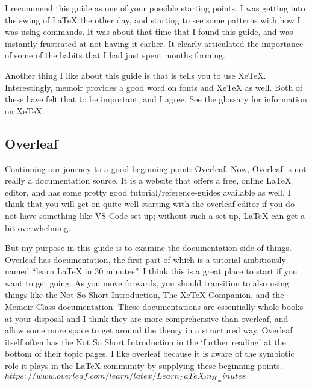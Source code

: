 \documentclass[12pt, oneside]{memoir}
\begin{document}
I recommend this guide as one of your possible starting points. I was getting into the swing of \LaTeX{} the other day, and starting to see some patterns with how I was using commands. It was about that time that I found this guide, and was instantly frustrated at not having it earlier. It clearly articulated the importance of some of the habits that I had just spent months forming.

Another thing I like about this guide is that is tells you to use XeTeX. Interestingly, memoir provides a good word on fonts and XeTeX as well. Both of these have felt that to be important, and I agree. See the glossary for information on XeTeX.

\subsection*{Overleaf}

Continuing our journey to a good beginning-point: Overleaf. Now, Overleaf is not really a documentation source. It is a website that offers a free, online \LaTeX{} editor, and has some pretty good tutorial/reference-guides available as well. I think that you will get on quite well starting with the overleaf editor if you do not have something like VS Code set up; without such a set-up, \LaTeX{} can get a bit overwhelming.

But my purpose in this guide is to examine the documentation side of things. Overleaf has documentation, the first part of which is a tutorial ambitiously named ``learn \LaTeX{} in 30 minutes''. I think this is a great place to start if you want to get going. As you move forwards, you should transition to also using things like the Not So Short Introduction, The XeTeX Companion, and the Memoir Class documentation. These documentations are essentially whole books at your disposal and I think they are more comprehensive than overleaf, and allow some more space to get around the theory in a structured way. Overleaf itself often has the Not So Short Introduction in the `further reading' at the bottom of their topic pages. I like overleaf because it is aware of the symbiotic role it plays in the \LaTeX{} community by supplying these beginning points.\\

$https://www.overleaf.com/learn/latex/Learn_LaTeX_in_30_minutes$
\end{document}
